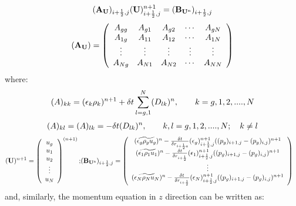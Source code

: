 \begin{eqnarray}
\htmlimage{}
({\bf A_U})_{i+\frac{1}{2},j} ({\bf U})_{i+\frac{1}{2},j}^{n+1} = 
({\bf B_{U^{\rm n}}})_{i+\frac{1}{2},j}
\nonumber
\end{eqnarray}
%
\begin{eqnarray}
\htmlimage{}
({\bf A_U}) = \left ( \begin{array}{ccccc}
A_{gg} & A_{g1} & A_{g2} & \cdots & A_{gN} \\
A_{1g} & A_{11} & A_{12} & \cdots & A_{1N} \\
\vdots  & \vdots  &   \vdots  &    \vdots &   \vdots  \\
A_{Ng} & A_{N1} & A_{N2} & \cdots & A_{NN}  \end{array} \right )
\nonumber
\end{eqnarray}
%
where:
%
\begin{eqnarray}
\htmlimage{}
(A)_{kk} = (\epsilon_k \rho_k)^{n+1} + \delta t \sum_{l=g,1}^{N} (D_{lk})^{n},
\qquad  k = g,1,2,....,N
\nonumber
\end{eqnarray}
%
\begin{eqnarray}
\htmlimage{}
(A)_{kl} = (A)_{lk} = - \delta t (D_{lk})^{n},
\qquad  k,l  = g,1,2,....,N; \quad k \not= l
\nonumber
\end{eqnarray}
%
\begin{eqnarray}
\htmlimage{}
({\bf U})^{n+1} =
\left( \begin{array}{c}
u_g \\
u_1 \\
u_2 \\
\vdots \\
u_N \end{array} \right )^{(n+1)}; &
({\bf B_{U^{\rm n}}})_{i+\frac{1}{2},j} = 
\left( \begin{array}{c}
(\widetilde {\epsilon_g \rho_g u_g})^n - 
\frac{\delta t}{\delta r_{i+\frac{1}{2}a}} 
(\epsilon_g)_{i+\frac{1}{2},j}^{n+1} ((p_g)_{i+1,j} - (p_g)_{i,j})^{n+1}     \\
(\widetilde {\epsilon_1 \rho_1 u_1})^n - 
\frac{\delta t}{\delta r_{i+\frac{1}{2}}} 
(\epsilon_1)_{i+\frac{1}{2},j}^{n+1} ((p_g)_{i+1,j} - (p_g)_{i,j})^{n+1}     \\
\vdots        \\
(\widetilde {\epsilon_N \rho_N u_N})^n -
\frac{\delta t}{\delta r_{i+\frac{1}{2}}} 
(\epsilon_N)_{i+\frac{1}{2},j}^{n+1} ((p_g)_{i+1,j} - (p_g)_{i,j})^{n+1}
\end{array} \right )
\nonumber
\end{eqnarray}
%
and, similarly, the momentum equation in $z$ direction can be written as:
